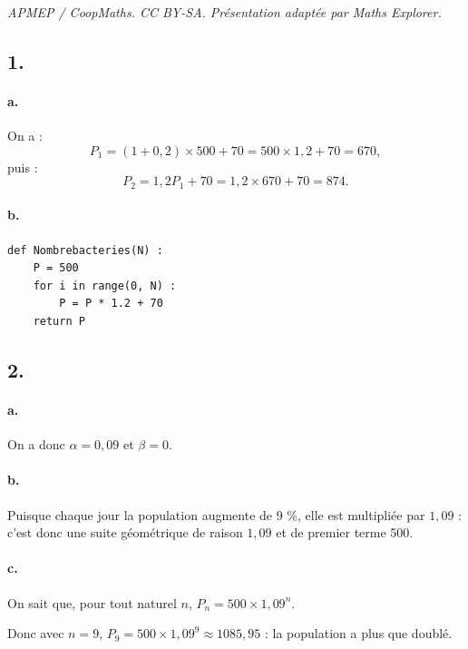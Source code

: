 \documentclass[10pt]{article}
\begin{document}
\noindent\textit{APMEP / CoopMaths. CC BY-SA. Présentation adaptée par Maths Explorer.}\par\medskip
\subsection*{1.}

\paragraph{a.} On a :
\[
P_1 = (1 + 0{,}2) \times 500 + 70 = 500 \times 1{,}2 + 70 = 670,
\]
puis :
\[
P_2 = 1{,}2P_1 + 70 = 1{,}2 \times 670 + 70 = 874.
\]

\paragraph{b.}
\begin{center}
\begin{lstlisting}[style=python]
def Nombrebacteries(N) :
    P = 500
    for i in range(0, N) :
        P = P * 1.2 + 70
    return P
\end{lstlisting}
\end{center}

\subsection*{2.}

\paragraph{a.} On a donc \(\alpha = 0{,}09\) et \(\beta = 0\).

\paragraph{b.} Puisque chaque jour la population augmente de 9 \%, elle est multipliée par \(1{,}09\) : c'est donc une suite géométrique de raison \(1{,}09\) et de premier terme 500.

\paragraph{c.} On sait que, pour tout naturel \(n\), \(P_n = 500 \times 1{,}09^n\).

Donc avec \(n = 9\), \(P_9 = 500 \times 1{,}09^9 \approx 1085{,}95\) : la population a plus que doublé.
\end{document}
